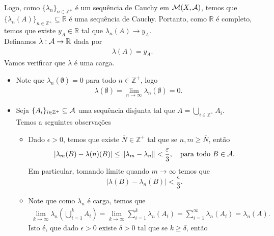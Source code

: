 \begin{homeworkProblem}[2]
\begin{solution}
\begin{enumerate}[a)]
\begin{align*}
      \end{align*}
      Logo, como $\{\lambda_{n}\}_{n\in\mathbb{Z}^{+}}$ é um sequência de Cauchy em $\mathcal{M}(X,\mathcal{A})$, temos que $\{\lambda_{n}(A)\}_{n\in\mathbb{Z}^{+}}\subseteq \mathbb{R}$ é uma sequência de Cauchy. Portanto, como $\mathbb{R}$ é completo, temos que existe $y_{A}\in\mathbb{R}$ tal que $\lambda_{n}(A)\to y_{A}$.\\
      Definamos $\lambda:\mathcal{A}\to\mathbb{R}$ dada por
      \begin{align*}
        \lambda(A)=y_A.
      \end{align*}
      Vamos verificar que $\lambda$ é uma carga.
      \begin{itemize}
        \item Note que $\lambda_{n}(\emptyset)=0$ para todo $n\in\mathbb{Z}^{+}$, logo
          \begin{align*}
            \lambda(\emptyset)=\lim_{n \to \infty}\lambda_{n}(\emptyset)=0.
          \end{align*}
        \item Seja $\{A_i\}_{i\in\mathbb{Z}^{+}}\subseteq\mathcal{A}$ uma sequência disjunta tal que $A=\bigcup_{i\in\mathbb{Z}^{+}}A_i$.\\
          Temos a seguintes observações
          \begin{itemize}
            \item Dado $\epsilon>0$, temos que existe $\overline{N}\in\mathbb{Z}^{+}$ tal que se $n,m\geq \overline{N}$, então
              \begin{align*}
                \left| \lambda_{m}(B)-\lambda(n)(B) \right|\leq \left\|\lambda_m-\lambda_n\right\|<\frac{\varepsilon}{3},\quad\text{para todo }B\in\mathcal{A}.
              \end{align*}
              Em particular, tomando límite quando $m\to\infty$ temos que
              \begin{equation}\label{eq:1-2}
                \left| \lambda(B)-\lambda_{n}(B) \right|<\frac{\epsilon}{3}.
              \end{equation}
            \item Note que como $\lambda_n$ é carga, temos que 
              \begin{align*}
                \lim_{k \to \infty}\lambda_{n}\left( \bigcup_{i=1}^{k}A_i \right)=\lim_{k \to \infty}\sum_{i=1}^{k}\lambda_{n}(A_i)=\sum_{i=1}^{\infty}\lambda_{n}(A_i)=\lambda_{n}(A).
              \end{align*}
              Isto é, que dado $\epsilon>0$ existe $\delta>0$ tal que se $k\geq \delta$, então

\end{itemize}
\end{itemize}
\end{enumerate}
\end{solution}
\end{homeworkProblem}
